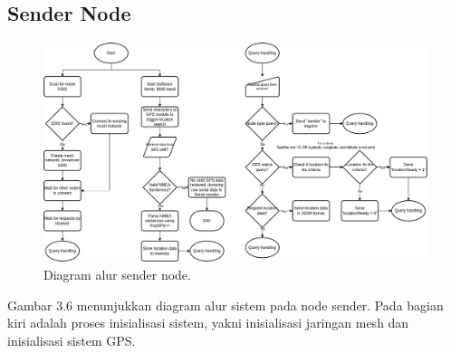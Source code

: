\subsection{Sender Node}
\begin{figure}[H]
	\centering
	\includegraphics[scale=0.35]{./assets/FlowchartSenderNew}
	\caption{Diagram alur sender node.}
\end{figure}
Gambar 3.6 menunjukkan diagram alur sistem pada node sender. Pada bagian kiri adalah proses inisialisasi sistem, yakni inisialisasi jaringan mesh dan inisialisasi sistem GPS.
